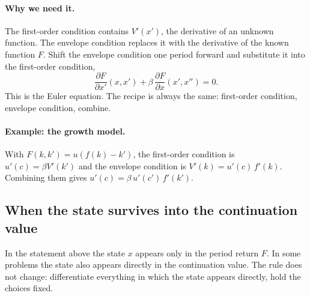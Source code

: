 \documentclass[11pt]{article}
\begin{document}
\paragraph{Why we need it.} The first-order condition contains $V'(x')$, the derivative of an unknown function. The envelope condition replaces it with the derivative of the known function $F$. Shift the envelope condition one period forward and substitute it into the first-order condition,
\begin{equation*}
\frac{\partial F}{\partial x'} \left( x, x' \right) + \beta\, \frac{\partial F}{\partial x} \left( x', x'' \right) = 0 .
\end{equation*}
This is the Euler equation. The recipe is always the same: first-order condition, envelope condition, combine.

\paragraph{Example: the growth model.} With $F(k, k') = u(f(k) - k')$, the first-order condition is $u'(c) = \beta V'(k')$ and the envelope condition is $V'(k) = u'(c)\, f'(k)$. Combining them gives $u'(c) = \beta\, u'(c')\, f'(k')$.

\subsection{When the state survives into the continuation value}

In the statement above the state $x$ appears only in the period return $F$. In some problems the state also appears directly in the continuation value. The rule does not change: differentiate everything in which the state appears directly, hold the choices fixed.
\end{document}
